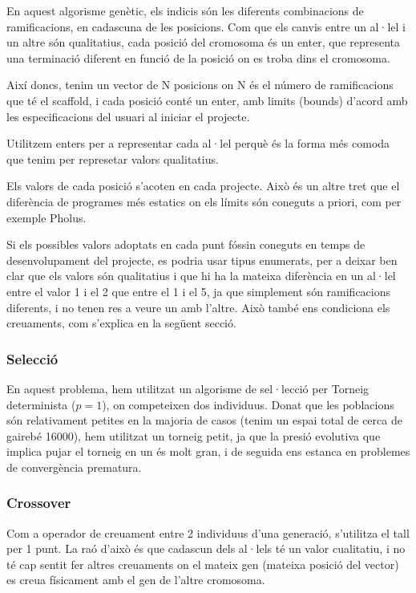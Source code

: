 \documentclass[titlepage,a4paper,12pt]{book}
\begin{document}
En aquest algorisme genètic, els indicis són les diferents combinacions de
ramificacions, en cadascuna de les posicions. Com que els canvis entre un al·lel i un
altre són qualitatius, cada posició del cromosoma és un enter, que representa
una terminació diferent en funció de la posició on es troba dins el cromosoma.

Així doncs, tenim un vector de N posicions on N és el número de ramificacions que té
el scaffold, i cada posició conté un enter, amb limits (bounds) d'acord amb les
especificacions del usuari al iniciar el projecte. 

Utilitzem enters per a representar cada al·lel perquè és la forma més comoda que
tenim per represetar valors qualitatius.

Els valors de cada posició s'acoten en cada projecte.  Això és un
altre tret que el diferència de programes més estatics on els límits són
coneguts a priori, com per exemple Pholus.

Si els possibles valors adoptats en cada punt fóssin coneguts en temps de
desenvolupament del projecte, es podria usar tipus enumerats, per a deixar ben
clar que els valors són qualitatius i que hi ha la mateixa diferència en un
al·lel entre el valor 1 i el 2 que entre el 1 i el 5, ja que simplement són
ramificacions diferents, i no tenen res a veure un amb l'altre.  Això també ens
condiciona els creuaments, com s'explica en la següent secció.


\subsubsection{Selecció} %
\label{ssub:CSeleccio}
En aquest problema, hem utilitzat un algorisme de sel·lecció per Torneig
determinista ($p=1$), on competeixen dos individuus.  Donat que les poblacions
són relativament petites en la majoria de casos (tenim un espai total de cerca
de gairebé 16000), hem utilitzat un torneig petit, ja que la presió evolutiva
que implica pujar el torneig en un és molt gran, i de seguida ens estanca en
problemes de convergència prematura.


\subsubsection{Crossover} %
\label{ssub:Crossover}

Com a operador de creuament entre 2 individuus d'una generació, s'utilitza el
tall per 1 punt.  La raó d'això és que cadascun dels al·lels té un valor
cualitatiu, i no té cap sentit fer altres creuaments on el mateix gen (mateixa
posició del vector) es creua físicament amb el gen de l'altre cromosoma.
\end{document}
